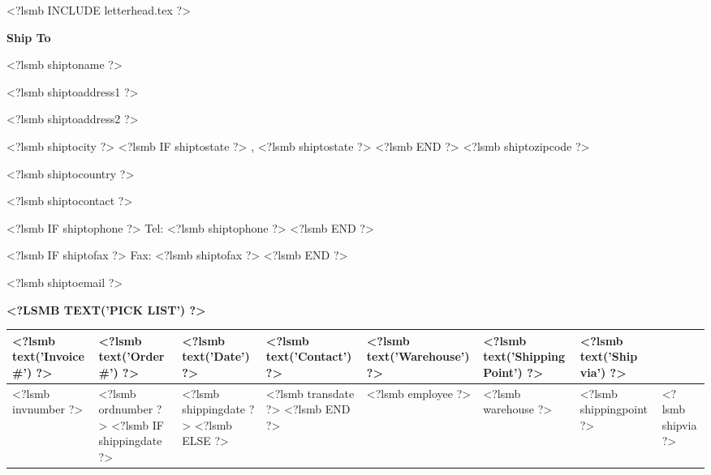 \documentclass{scrartcl}
\begin{document}
\pagestyle{myheadings}
\thispagestyle{empty}

<?lsmb INCLUDE letterhead.tex ?>


%
%
%
%

\vspace*{0.5cm}

\parbox[t]{.5\textwidth}{
  \textbf{Ship To}
} \hfill

\vspace{0.3cm}

\parbox[t]{.5\textwidth}{
  
<?lsmb shiptoname ?>

<?lsmb shiptoaddress1 ?>

<?lsmb shiptoaddress2 ?>

<?lsmb shiptocity ?>
<?lsmb IF shiptostate ?>
\hspace{-0.1cm}, <?lsmb shiptostate ?>
<?lsmb END ?>
<?lsmb shiptozipcode ?>

<?lsmb shiptocountry ?>
}
\parbox[t]{.5\textwidth}{
  <?lsmb shiptocontact ?>

  <?lsmb IF shiptophone ?>
  Tel: <?lsmb shiptophone ?>
  <?lsmb END ?>

  <?lsmb IF shiptofax ?>
  Fax: <?lsmb shiptofax ?>
  <?lsmb END ?>

  <?lsmb shiptoemail ?>
}
\hfill

\vspace{1cm}

\textbf{\MakeUppercase{<?lsmb text('Pick List') ?>}}
\hfill

\vspace{1cm}

\begin{tabularx}{\textwidth}{*{7}{|X}|} \hline
  \textbf{<?lsmb text('Invoice #') ?>} & \textbf{<?lsmb text('Order #') ?>} 
   & \textbf{<?lsmb text('Date') ?>} & \textbf{<?lsmb text('Contact') ?>}
  & \textbf{<?lsmb text('Warehouse') ?>} 
  & \textbf{<?lsmb text('Shipping Point') ?>} 
  & \textbf{<?lsmb text('Ship via') ?>} \\ [0.5em]
  \hline
  <?lsmb invnumber ?> & <?lsmb ordnumber ?>
  <?lsmb IF shippingdate ?>
  & <?lsmb shippingdate ?>
  <?lsmb ELSE ?>
  & <?lsmb transdate ?>
  <?lsmb END ?>
  & <?lsmb employee ?> & <?lsmb warehouse ?> & <?lsmb shippingpoint ?> & <?lsmb shipvia ?> \\
  \hline
\end{tabularx}
  
\end{document}

